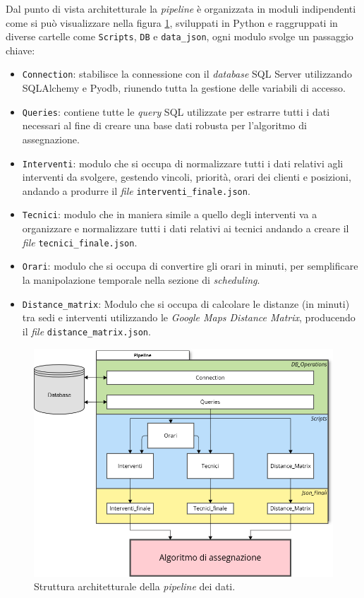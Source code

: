 Dal punto di vista architetturale la \textit{pipeline} è organizzata in moduli indipendenti come si può visualizzare nella figura \ref{fig:giagram-pip}, sviluppati in Python e raggruppati in diverse cartelle come \texttt{Scripts}, \texttt{DB} e \texttt{data\_json}, ogni modulo svolge un passaggio chiave:
\begin{itemize}
    \item \texttt{Connection}: stabilisce la connessione con il \textit{database} SQL Server utilizzando SQLAlchemy e Pyodb, riunendo tutta la gestione delle variabili di accesso.
    \item \texttt{Queries}: contiene tutte le \textit{query} SQL utilizzate per estrarre tutti i dati necessari al fine di creare una base dati robusta per l'algoritmo di assegnazione.
    \item \texttt{Interventi}: modulo che si occupa di normalizzare tutti i dati relativi agli interventi da svolgere, gestendo vincoli, priorità, orari dei clienti e posizioni, andando a produrre il \textit{file} \texttt{interventi\_finale.json}.
    \item \texttt{Tecnici}: modulo che in maniera simile a quello degli interventi va a organizzare e normalizzare tutti i dati relativi ai tecnici andando a creare il \textit{file} \texttt{tecnici\_finale.json}.
    \item \texttt{Orari}: modulo che si occupa di convertire gli orari in minuti, per semplificare la manipolazione temporale nella sezione di \textit{scheduling}.
    \item \texttt{Distance\_matrix}: Modulo che si occupa di calcolare le distanze (in minuti) tra sedi e interventi utilizzando le  \textit{Google Maps Distance Matrix}, producendo il \textit{file} \texttt{distance\_matrix.json}.
\end{itemize}

\begin{figure}[H]
    \centering
    \includegraphics[width=\textwidth]{thesis/files/img/pip.png}
    \caption{Struttura architetturale della \textit{pipeline} dei dati.}
    \label{fig:giagram-pip}
\end{figure}

